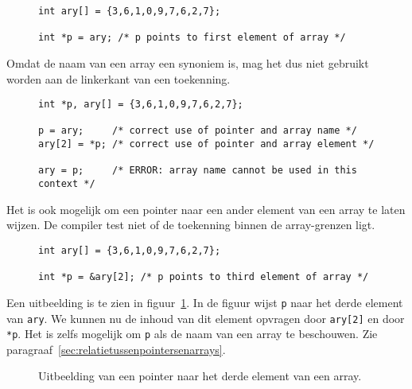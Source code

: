 \begin{figure}[!ht]
\begin{lstlisting}[caption=Een pointer naar het eerste element van een array.,label=cod:poifirstarray2]
int ary[] = {3,6,1,0,9,7,6,2,7};

int *p = ary; /* p points to first element of array */
\end{lstlisting}
\end{figure}

Omdat de naam van een array een synoniem is, mag het dus niet gebruikt worden aan de linkerkant van een toekenning.

\begin{figure}[!ht]
\begin{lstlisting}[caption=Een pointer naar het eerste element van een array.,label=cod:poifirstarray3]
int *p, ary[] = {3,6,1,0,9,7,6,2,7};

p = ary;     /* correct use of pointer and array name */
ary[2] = *p; /* correct use of pointer and array element */

ary = p;     /* ERROR: array name cannot be used in this context */
\end{lstlisting}
\end{figure}

Het is ook mogelijk om een pointer naar een ander element van een array te laten wijzen. De compiler test niet of de toekenning binnen de array-grenzen ligt.

\begin{figure}[!ht]
\begin{lstlisting}[caption=Een pointer naar het derde element van een array.,label=cod:poithirdarray]
int ary[] = {3,6,1,0,9,7,6,2,7};

int *p = &ary[2]; /* p points to third element of array */
\end{lstlisting}
\end{figure}

Een uitbeelding is te zien in figuur~\ref{fig:poithirdarray}. In de figuur wijst \texttt{p} naar het derde element van \texttt{ary}. We kunnen nu de inhoud van dit element opvragen door \texttt{ary[2]} en door \texttt{*p}. Het is zelfs mogelijk om \texttt{p} als de naam van een array te beschouwen. Zie paragraaf~\ref{sec:relatietussenpointersenarrays}.

\begin{figure}[!ht]
\centering
{}
\caption{Uitbeelding van een pointer naar het derde element van een array.}
\label{fig:poithirdarray}
\end{figure}


